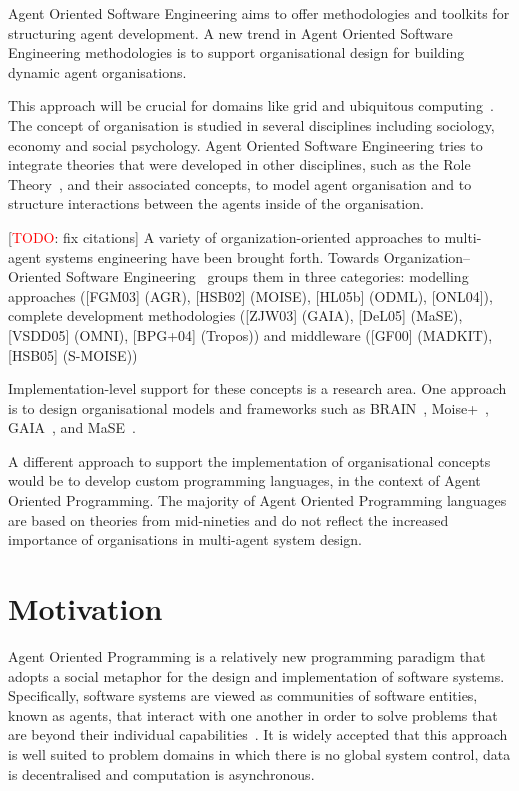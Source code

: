\documentclass[a4paper,12pt,oneside,fleqn]{book} %
\newcommand{\todo}[1]{[\textcolor{red}{TODO}: #1]}
\begin{document}
Agent Oriented Software Engineering aims to offer methodologies and
toolkits for structuring agent development. A new trend in Agent Oriented
Software Engineering methodologies is to support organisational design for
building dynamic agent organisations.

This approach will be crucial for domains like grid and ubiquitous
computing~\cite{luck2005agent}. The concept of organisation is studied in
several disciplines including sociology, economy and social psychology.
Agent Oriented Software Engineering tries to integrate theories that were
developed in other disciplines, such as the Role
Theory~\cite{biddle1986recent}, and their associated concepts, to model
agent organisation and to structure interactions between the agents inside
of the organisation. 


\todo{fix citations}
A variety of organization-oriented approaches to multi-agent systems
engineering have been brought forth.  Towards Organization–Oriented
Software Engineering~\cite{} groups them in three categories: modelling
approaches ([FGM03] (AGR), [HSB02] (MOISE), [HL05b] (ODML), [ONL04]),
complete development methodologies ([ZJW03] (GAIA), [DeL05] (MaSE),
[VSDD05] (OMNI), [BPG+04] (Tropos)) and middleware ([GF00] (MADKIT),
[HSB05] (S-MOISE))


Implementation-level support for these concepts is a research area. One
approach is to design organisational models and frameworks such as
BRAIN~\cite{DBLP:conf/coopis/CabriLZ03},
Moise+~\cite{DBLP:conf/atal/HubnerSB02},
GAIA~\cite{DBLP:journals/aamas/WooldridgeJK00}, and
MaSE~\cite{deloach2001analysis}.

A different approach to support the implementation of organisational
concepts would be to develop custom programming languages, in the context
of Agent Oriented Programming. The majority of Agent Oriented Programming
languages are based on theories from mid-nineties and do not reflect the
increased importance of organisations in multi-agent system design.
\section{Motivation}
Agent Oriented Programming is a relatively new programming paradigm that
adopts a social metaphor for the design and implementation of software
systems.  Specifically, software systems are viewed as communities of
software entities, known as agents, that interact with one another in order
to solve problems that are beyond their individual
capabilities~\cite{DBLP:journals/ai/Shoham93}. It is widely accepted that
this approach is well suited to problem domains in which there is no global
system control, data is decentralised and computation is asynchronous.
\end{document}
